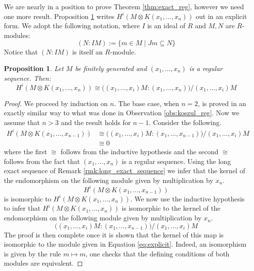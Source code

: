 \documentclass[12pt]{article}
\theoremstyle{plain}
\newtheorem{proposition}[thm]{Proposition}
\theoremstyle{definition}
\begin{document}
We are nearly in a position to prove Theorem \ref{thm:exact_reg}, however we need one more result. Proposition \ref{prop:kozology_explicit} writes $H^i(M \otimes K(x_1,...,x_n))$ out in an explicit form. We adopt the following notation, where $I$ is an ideal of $R$ and $M,N$ are $R$-modules:
\begin{equation}
    (N:IM) := \lbrace m \in M \mid Jm \subseteq N\rbrace
\end{equation}
Notice that $(N:IM)$ is itself an $R$-module.
\begin{proposition}\label{prop:kozology_explicit}
Let $M$ be finitely generated and $(x_1,...,x_n)$ is a regular sequence. Then:
\begin{equation}\label{eq:explicit}
    H^i(M \otimes K(x_1,...,x_n)) \cong \big((x_1,...,x_i)M:(x_1,...,x_n)\big)/(x_1,...,x_i)M
\end{equation}
\end{proposition}
\begin{proof}
We proceed by induction on $n$. The base case, when $n = 2$, is proved in an exactly similar way to what was done in Observation \ref{obs:koszul_reg}. Now we assume that $n > 3$ and the result holds for $n-1$. Consider the following.
\begin{align*}
    H^i(M \otimes K(x_1,...,x_{n-1})) &\cong \big((x_1,...,x_i)M:(x_1,...,x_{n-1})\big)/(x_1,...,x_i)M\\
    &\cong 0
\end{align*}
where the first $\cong$ follows from the inductive hypothesis and the second $\cong$ follows from the fact that $(x_1,...,x_n)$ is a regular sequence. Using the long exact sequence of Remark \ref{rmk:long_exact_sequence} we infer that the kernel of the endomorphism on the following module given by multiplication by $x_n$.
\begin{equation}
    H^{i}(M \otimes K(x_1,...,x_{n-1}))
\end{equation}
is isomorphic to $H^{i}(M \otimes K(x_1,...,x_n))$. We now use the inductive hypothesis to infer that $H^i(M \otimes K(x_1,...,x_n))$ is isomorphic to the kernel of the endomorphism on the following module given by multiplication by $x_n$.
\begin{equation}
    \big((x_1,...,x_i)M:(x_1,...,x_{n-1})\big)/(x_1,...,x_i)M
\end{equation}
The proof is then complete once it is shown that the kernel of this map is isomorphic to the module given in Equation \ref{eq:explicit}. Indeed, an isomorphism is given by the rule $m \longmapsto m$, one checks that the defining conditions of both modules are equivalent.
\end{proof}
\end{document}
